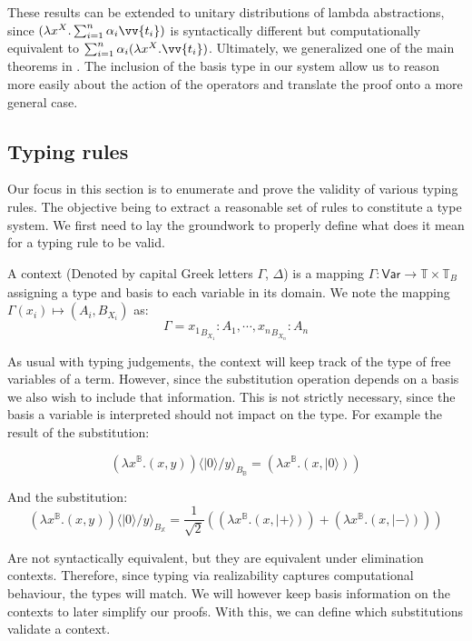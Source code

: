 \documentclass[runningheads,orivec,envcountsame,envcountsect]{llncs}
\newcommand\ket[1]{\ensuremath{|#1\rangle}}
\newcommand\Var{\ensuremath{\mathsf{Var}}}
\newcommand\ansubst[2]{\ensuremath{\langle #1 \rangle_{#2}}}
\def\Pair#1#2{(#1,#2)} %
\def\Lam#1#2#3{\lambda#1^{#2}{.}#3} %
\def\Type{\mathbb{T}}
\def\BasisType{\Type_{\basis{}}}
\newcommand\B{\mathbb B}
\newcommand\XB{\mathbb X}
\newcommand\basis[1]{\ensuremath{B_{ #1 }}}
\begin{document}
These results can be extended to unitary distributions of lambda abstractions, since $(\Lam{x}{X}{\sum_{i=1}^{n}\alpha_i \vv{t_i}})$ is syntactically different but computationally equivalent to $\sum_{i=1}^{n}\alpha_i (\Lam{x}{X}{\vv{t_i}})$. Ultimately, we generalized one of the main theorems in \cite{DiazcaroGuillermoMiquelValironLICS19}. The inclusion of the basis type in our system allow us to reason more easily about the action of the operators and translate the proof onto a more general case. 


\subsection{Typing rules}    
Our focus in this section is to enumerate and prove the validity of various typing rules. The objective being to extract a reasonable set of rules to constitute a type system. We first need to lay the groundwork to properly define what does it mean for a typing rule to be valid.

\begin{definition}
    A context (Denoted by capital Greek letters $\Gamma$, $\Delta$) is a mapping $\Gamma:\Var\to\Type\times\BasisType$ assigning a type and basis to each variable in its domain. We note the mapping $\Gamma(x_i)\mapsto(A_i, \basis{X_i})$ as:
    \[
    \Gamma = {x_1}_{\basis{X_1}}:A_1,\dotsb, {x_n}_{\basis{X_n}}:A_n
    \]
\end{definition}

As usual with typing judgements, the context will keep track of the type of free variables of a term. However, since the substitution operation depends on a basis we also wish to include that information. This is not strictly necessary, since the basis a variable is interpreted should not impact on the type. For example the result of the substitution:

\[
(\Lam{x}{\B}{\Pair{x}{y}})\ansubst{\ket{0}/y}{\basis{\B}} = (\Lam{x}{\B}{\Pair{x}{\ket{0}}})
\]

And the substitution:
\[
(\Lam{x}{\B}{(x, y)})\ansubst{\ket{0}/y}{\basis{\XB}} = \frac{1}{\sqrt{2}} ((\Lam{x}{\B}{\Pair{x}{\ket{+}}}) + (\Lam{x}{\B}{\Pair{x}{\ket{-}}}))
\]

Are not syntactically equivalent, but they are equivalent under elimination contexts. Therefore, since typing via realizability captures computational behaviour, the types will match. We will however keep basis information on the contexts to later simplify our proofs. With this, we can define which substitutions validate a context.
\end{document}
